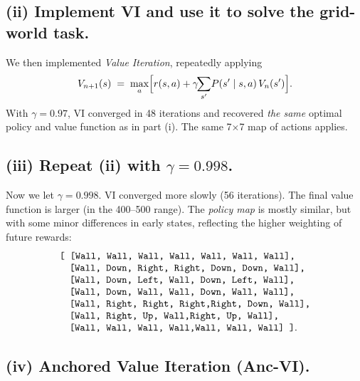 \subsection*{(ii) Implement VI and use it to solve the grid-world task.}

\noindent
We then implemented \emph{Value Iteration}, repeatedly applying
\[
  V_{n+1}(s) \;=\;\max_{a}\Bigl[r(s,a)+\gamma\!\!\sum_{s'}\!P(s'\mid s,a)\,V_{n}(s')\Bigr].
\]
With \(\gamma=0.97\), VI converged in 48 iterations and recovered \emph{the same} 
optimal policy and value function as in part (i).  The same 7$\times$7 map of actions
applies.

\subsection*{(iii) Repeat (ii) with \(\gamma=0.998\).}

\noindent
Now we let \(\gamma=0.998\).  VI converged more slowly (56 iterations). 
The final value function is larger (in the 400--500 range). 
The \emph{policy map} is mostly similar, but with some minor differences in early states, 
reflecting the higher weighting of future rewards:
\[
\begin{array}{l}
\text{\ttfamily
[ [Wall,  Wall,  Wall,  Wall,  Wall,  Wall,  Wall],}\\
\quad \text{\ttfamily [Wall, Down,  Right, Right, Down,  Down,  Wall],}\\
\quad \text{\ttfamily [Wall, Down,  Left,  Wall, Down,  Left,  Wall],}\\
\quad \text{\ttfamily [Wall, Down,  Wall,  Wall, Down,  Wall,  Wall],}\\
\quad \text{\ttfamily [Wall, Right, Right, Right,Right, Down,  Wall],}\\
\quad \text{\ttfamily [Wall, Right, Up,    Wall,Right, Up,    Wall],}\\
\quad \text{\ttfamily [Wall, Wall,  Wall,  Wall,Wall,  Wall,  Wall] ]}.
\end{array}
\]

\subsection*{(iv) Anchored Value Iteration (Anc-VI).}


